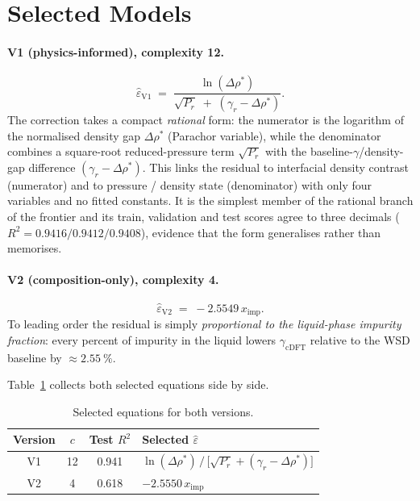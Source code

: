\documentclass[11pt]{article}
\newcommand{\eps}{\varepsilon}
\newcommand{\gcDFT}{\gamma_{\mathrm{cDFT}}}
\newcommand{\xim}{x_{\mathrm{imp}}}
\newcommand{\Prr}{P_r}
\newcommand{\gr}{\gamma_r}
\newcommand{\drhon}{\Delta\rho^{\!*}}
\begin{document}
\section{Selected Models}
\label{sec:final}

\paragraph{V1 (physics-informed), complexity 12.}
\begin{equation}
  \widehat{\eps}_{\mathrm{V1}}
  \;=\; \frac{\ln(\drhon)}
             {\sqrt{\Prr}\;+\;(\gr-\drhon)} .
  \label{eq:v1}
\end{equation}
The correction takes a compact \emph{rational} form: the numerator is the
logarithm of the normalised density gap $\drhon$ (Parachor variable), while
the denominator combines a square-root reduced-pressure term $\sqrt{\Prr}$
with the baseline-$\gamma$/density-gap difference $(\gr-\drhon)$. This links
the residual to interfacial density contrast (numerator) and to
pressure / density state (denominator) with only four variables and no fitted
constants. It is the simplest member of the rational branch of the frontier
and its train, validation and test scores agree to three decimals
($R^2 = 0.9416 / 0.9412 / 0.9408$), evidence that the form generalises rather
than memorises.

\paragraph{V2 (composition-only), complexity 4.}
\begin{equation}
  \widehat{\eps}_{\mathrm{V2}} \;=\; -2.5549\,\xim .
  \label{eq:v2}
\end{equation}
To leading order the residual is simply \emph{proportional to the
liquid-phase impurity fraction}: every percent of impurity in the liquid
lowers $\gcDFT$ relative to the WSD baseline by $\approx\SI{2.55}{\percent}$.

Table~\ref{tab:final} collects both selected equations side by side.

\begin{table}[h]
\centering
\caption{Selected equations for both versions.}
\label{tab:final}
\small
\renewcommand{\arraystretch}{1.4}
\begin{tabular}{c c c >{\raggedright\arraybackslash}p{7.6cm}}
\toprule
Version & $c$ & Test $R^2$ & Selected $\widehat{\eps}$ \\
\midrule
V1 & 12 & 0.941 &
  $\ln(\drhon)\,/\,\bigl[\sqrt{\Prr}+(\gr-\drhon)\bigr]$ \\
V2 & 4  & 0.618 & $-2.5550\,\xim$ \\
\bottomrule
\end{tabular}
\end{table}
\end{document}
